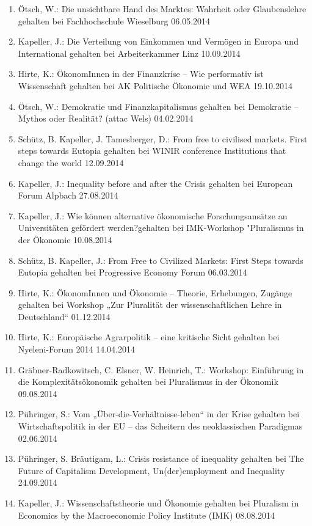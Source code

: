 \begin{enumerate}
	\item Ötsch, W.: Die unsichtbare Hand des Marktes: Wahrheit oder Glaubenslehre gehalten bei Fachhochschule Wieselburg 06.05.2014
	\item Kapeller, J.: Die Verteilung von Einkommen und Vermögen in Europa und International gehalten bei Arbeiterkammer Linz 10.09.2014
	\item Hirte, K.: ÖkonomInnen in der Finanzkrise -- Wie performativ ist Wissenschaft gehalten bei AK Politische Ökonomie und WEA 19.10.2014
	\item Ötsch, W.: Demokratie und Finanzkapitalismus gehalten bei Demokratie -- Mythos oder Realität? (attac Wels) 04.02.2014
	\item Schütz, B. Kapeller, J. Tamesberger, D.: From free to civilised markets. First steps towards Eutopia gehalten bei WINIR conference \glqq Institutions that change the world\grqq{} 12.09.2014
	\item Kapeller, J.: Inequality before and after the Crisis gehalten bei European Forum Alpbach 27.08.2014
	\item Kapeller, J.: Wie können alternative ökonomische Forschungsansätze an Universitäten gefördert werden?\glqq  gehalten bei IMK-Workshop "Pluralismus in der Ökonomie\grqq{} 10.08.2014
	\item Schütz, B. Kapeller, J.: From Free to Civilized Markets: First Steps towards Eutopia gehalten bei Progressive Economy Forum 06.03.2014
	\item Hirte, K.: ÖkonomInnen und Ökonomie – Theorie, Erhebungen, Zugänge gehalten bei Workshop „Zur Pluralität der wissenschaftlichen Lehre in Deutschland“ 01.12.2014
	\item Hirte, K.: Europäische Agrarpolitik – eine kritische Sicht gehalten bei Nyeleni-Forum 2014 14.04.2014
	\item Gräbner-Radkowitsch, C. Elsner, W. Heinrich, T.: Workshop: Einführung in die Komplexitätsökonomik gehalten bei Pluralismus in der Ökonomik 09.08.2014
	\item Pühringer, S.: Vom „Über-die-Verhältnisse-leben“ in der Krise gehalten bei Wirtschaftspolitik in der EU – das Scheitern des neoklassischen Paradigmas 02.06.2014
	\item Pühringer, S. Bräutigam, L.: Crisis resistance of inequality gehalten bei The Future of Capitalism Development, Un(der)employment and Inequality 24.09.2014
	\item Kapeller, J.: Wissenschaftstheorie und Ökonomie gehalten bei Pluralism in Economics by the Macroeconomic Policy Institute (IMK) 08.08.2014

\end{enumerate}
